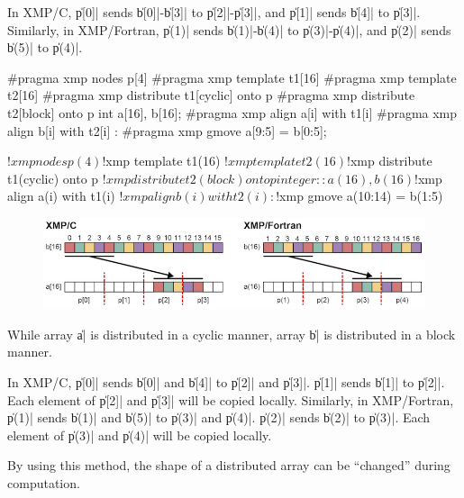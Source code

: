 In XMP/C, \|p[0]| sends \|b[0]|-\|b[3]| to \|p[2]|-\|p[3]|, and \|p[1]|
sends \|b[4]| to \|p[3]|. Similarly, in XMP/Fortran, \|p(1)| sends
\|b(1)|-\|b(4)| to \|p(3)|-\|p(4)|, and \|p(2)| sends \|b(5)| to \|p(4)|.

\begin{XCexample}
#pragma xmp nodes p[4]
#pragma xmp template t1[16]
#pragma xmp template t2[16]
#pragma xmp distribute t1[cyclic] onto p
#pragma xmp distribute t2[block] onto p
int a[16], b[16];
#pragma xmp align a[i] with t1[i]
#pragma xmp align b[i] with t2[i]
     :
#pragma xmp gmove
  a[9:5] = b[0:5];
\end{XCexample}

\begin{XFexample}
!$xmp nodes p(4)
!$xmp template t1(16)
!$xmp template t2(16)
!$xmp distribute t1(cyclic) onto p
!$xmp distribute t2(block) onto p
integer :: a(16), b(16)
!$xmp align a(i) with t1(i)
!$xmp align b(i) with t2(i)
     :
!$xmp gmove
  a(10:14) = b(1:5)
\end{XFexample}

\begin{figure}
  \centering
  \includegraphics[width=\textwidth]{figs/gmove_cyclic.png}
\end{figure}

While array \|a| is distributed in a cyclic manner, array \|b| is
distributed in a block manner.

In XMP/C, \|p[0]| sends \|b[0]| and \|b[4]| to \|p[2]| and
\|p[3]|. \|p[1]| sends \|b[1]| to \|p[2]|. Each element of \|p[2]| and
\|p[3]| will be copied locally. Similarly, in XMP/Fortran, \|p(1)| sends
\|b(1)| and \|b(5)| to \|p(3)| and \|p(4)|. \|p(2)| sends \|b(2)| to
\|p(3)|. Each element of \|p(3)| and \|p(4)| will be copied locally.


By using this method, the shape of a distributed array can be ``changed''
during computation.

